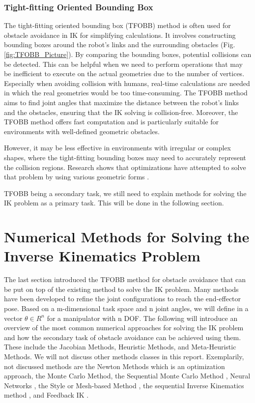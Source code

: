 \documentclass[conference]{IEEEtran}
\begin{document}
\subsubsection{Tight-fitting Oriented Bounding Box}
The tight-fitting oriented bounding box (TFOBB) method is often used for obstacle avoidance in IK \cite{chembuly_efficient_2020} for simplifying calculations. It involves constructing bounding boxes around the robot's links and the surrounding obstacles (Fig. \ref{fig:TFOBB_Picture}). By comparing the bounding boxes, potential collisions can be detected. This can be helpful when we need to perform operations that may be inefficient to execute on the actual geometries due to the number of vertices. Especially when avoiding collision with humans, real-time calculations are needed in which the real geometries would be too time-consuming.
The TFOBB method aims to find joint angles that maximize the distance between the robot's links and the obstacles, ensuring that the IK solving is collision-free.
Moreover, the TFOBB method offers fast computation and is particularly suitable for environments with well-defined geometric obstacles. 

However, it may be less effective in environments with irregular or complex shapes, where the tight-fitting bounding boxes may need to accurately represent the collision regions. Research shows that optimizations have attempted to solve that problem by using various geometric forms \cite{barequet_efficiently_2001} \cite{held_evaluation_1995}.

TFOBB being a secondary task, we still need to explain methods for solving the IK problem as a primary task. This will be done in the following section.




\section{Numerical Methods for Solving the Inverse Kinematics Problem}\label{Numerical methods intro}
The last section introduced the TFOBB method for obstacle avoidance that can be put on top of the existing method to solve the IK problem. Many methods have been developed to refine the joint configurations to reach the end-effector pose. Based on a m-dimensional task space and n joint angles, we will define in a vector $\theta \in R^n$ for a manipulator with n DOF.
The following will introduce an overview of the most common numerical approaches for solving the IK problem and how the secondary task of obstacle avoidance can be achieved using them. These include the Jacobian Methods, Heuristic Methods, and Meta-Heuristic Methods. We will not discuss other methods classes in this report. Exemplarily, not discussed methods are the Newton Methods \cite{fletcher_practical_2000} \cite{kwan_wu_chin_closed-form_1997} which is an optimization approach, the Monte Carlo Method\cite{kwan_wu_chin_closed-form_1997}, the Sequential Monte Carlo Method \cite{perales_inverse_2008}, Neural Networks \cite{mao_obstacle_1997}, the Style or Mesh-based Method \cite{grochow_style-based_2004} \cite{sumner_mesh-based_2005}, the sequential Inverse Kinematics method \cite{perales_predicting_2008}, and Feedback IK \cite{pechev_inverse_2008}.
\end{document}
